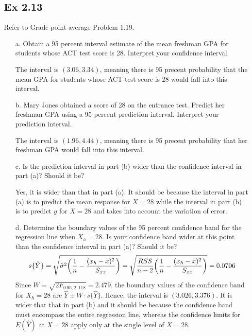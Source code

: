 \documentclass[10pt]{report}
\DeclarePairedDelimiter\autoparen{(}{)}
\newcommand{\pa}[1]{\autoparen*{#1}}
\begin{document}
\subsection*{Ex 2.13}
Refer to Grade point average Problem 1.19.
\begin{enumerate}
	\item [a.]
	Obtain a 95 percent interval estimate of the mean freshman GPA for students whose ACT test score is 28. Interpret your confidence interval.
	
	The interval is $(3.06,3.34)$, meaning there is 95 precent probability that the mean GPA for students whose ACT test score is 28 would fall into this interval.
	
	\item [b.]
	Mary Jones obtained a score of 28 on the entrance test. Predict her freshman GPA using a 95 percent prediction interval. Interpret your prediction interval.
	
	The interval is $(1.96,4.44)$, meaning there is 95 precent probability that her freshman GPA would fall into this interval.
	
	\item [c.]
	Is the prediction interval in part (b) wider than the confidence interval in part (a)? Should it be?
	
	Yes, it is wider than that in part (a). It should be because the interval in part (a) is to  predict the mean response for $X=28$ while the interval in part (b) is to predict $y$ for $X=28$ and takes into account the variation of error.
	
	\item [d.]
	Determine the boundary values of the 95 percent confidence band for the regression line when $X_h = 28$. Is your confidence band wider at this point than the confidence interval in part (a)? Should it be?
	\[
	s\{\hat{Y}\} = \sqrt{\hat{\sigma}^2 \pa{\frac{1}{n} - \frac{(x_h-\bar{x})^2}{S_{xx}}}} = \sqrt{\frac{RSS}{n-2}\pa{\frac{1}{n} - \frac{(x_h-\bar{x})^2}{S_{xx}}}} = 0.0706
	\]
	Since $W = \sqrt{2F_{0.95, 2, 118}} = 2.479$, the boundary values of the confidence band for $X_h = 28$ are $\hat{Y} \pm W\cdot s\{\hat{Y}\}$. Hence, the interval is $(3.026, 3.376)$. It is wider that that in part (b) and it should be because the confidence band must encompass the entire regression line, whereas the confidence limits for $E(\hat{Y})$ at $X = 28$ apply only at the single level of $X = 28$.
\end{enumerate}
\end{document}
